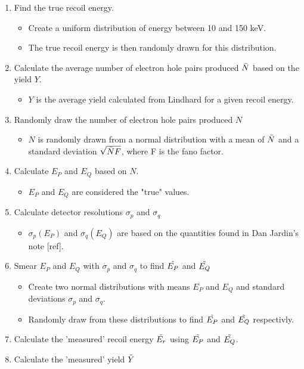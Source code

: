 \documentclass[12pt]{book}
\begin{document}
    

\begin{enumerate}
    \item Find the true recoil energy. 
    \begin{itemize}
        \item Create a uniform distribution of energy between 10 and 150 keV.
        \item The true recoil energy is then randomly drawn for this distribution. 
    \end{itemize} 
  \item Calculate the average number of electron hole pairs produced $\Bar{N}$ based on the yield $Y$.
   \begin{itemize}
        \item $Y$ is the average yield calculated from Lindhard for a given recoil energy.  
    \end{itemize} 
  
  \item Randomly draw the number of electron hole pairs produced $N$
   \begin{itemize}
        \item $N$ is randomly drawn from a normal distribution with a mean of $\Bar{N}$ and a standard deviation $\sqrt{\Bar{N}F}$, where F is the fano factor. 
    \end{itemize} 

    \item Calculate $E_P$ and $E_Q$ based on $N$.
       \begin{itemize}
        \item $E_P$ and $E_Q$ are considered the "true" values. 
    \end{itemize} 
    
    \item Calculate detector resolutions $\sigma_p$ and $\sigma_q$ 
        \begin{itemize}
        \item  $\sigma_p(E_P)$ and $\sigma_q(E_Q)$ are based on the quantities found in Dan Jardin's note [ref].
        \end{itemize} 
    
    \item Smear $E_P$ and $E_Q$ with $\sigma_p$ and $\sigma_q$ to find $\Tilde{E_P}$ and $\Tilde{E_Q}$
        \begin{itemize}
        \item Create two normal distributions with means $E_P$ and $E_Q$ and standard deviations $\sigma_p$ and $\sigma_q$.
        \item Randomly draw from these distributions to find $\Tilde{E_P}$ and $\Tilde{E_Q}$ respectivly. 
        \end{itemize} 
    \item Calculate the 'measured' recoil energy $\Tilde{E_r}$ using $\Tilde{E_P}$ and $\Tilde{E_Q}$. 
    \item Calculate the 'measured' yield $\Tilde{Y}$
    
    
\end{enumerate}
\end{document}
